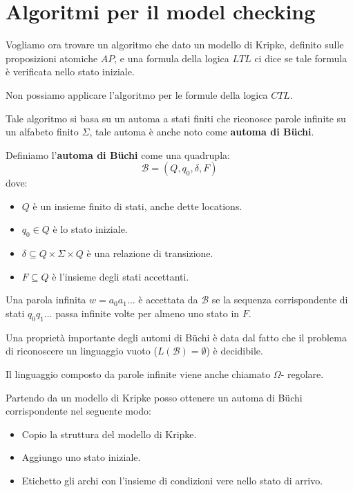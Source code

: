 \section{Algoritmi per il model checking}
Vogliamo ora trovare un algoritmo che dato un modello di Kripke, definito sulle
proposizioni atomiche $AP$, e una formula della logica $LTL$ ci dice se tale
formula è verificata nello stato iniziale.
\begin{nota}
    Non possiamo applicare l'algoritmo per le formule della logica $CTL$.
\end{nota}
Tale algoritmo si basa su un automa a stati finiti che riconosce parole infinite
su un alfabeto finito $\Sigma$, tale automa è anche noto come \textbf{automa di
    Büchi}.
\begin{definizione}
    Definiamo l'\textbf{automa di Büchi} come una quadrupla:
    \begin{equation}
        \mathcal{B} = (Q, q_0, \delta, F)
    \end{equation}
    dove:
    \begin{itemize}
        \item $Q$ è un insieme finito di stati, anche dette locations.
        \item $q_0 \in Q$ è lo stato iniziale.
        \item $\delta \subseteq Q \times \Sigma \times Q$ è una relazione di
              transizione.
        \item $F \subseteq Q$ è l'insieme degli stati accettanti.
    \end{itemize}
\end{definizione}
\begin{definizione}
    Una parola infinita $w = a_0a_1\dots$ è accettata da $\mathcal{B}$ se la
    sequenza corrispondente di stati $q_0q_1\dots$ passa infinite volte per
    almeno uno stato in $F$.
\end{definizione}
Una proprietà importante degli automi di Büchi è data dal fatto che il problema
di riconoscere un linguaggio vuoto ($L(\mathcal{B}) = \emptyset$) è decidibile.
\begin{nota}
    Il linguaggio composto da parole infinite viene anche chiamato $\Omega$-
    regolare.
\end{nota}
Partendo da un modello di Kripke posso ottenere un automa di Büchi corrispondente
nel seguente modo:
\begin{itemize}
    \item Copio la struttura del modello di Kripke.
    \item Aggiungo uno stato iniziale.
    \item Etichetto gli archi con l'insieme di condizioni vere nello stato di
          arrivo.
\end{itemize}
